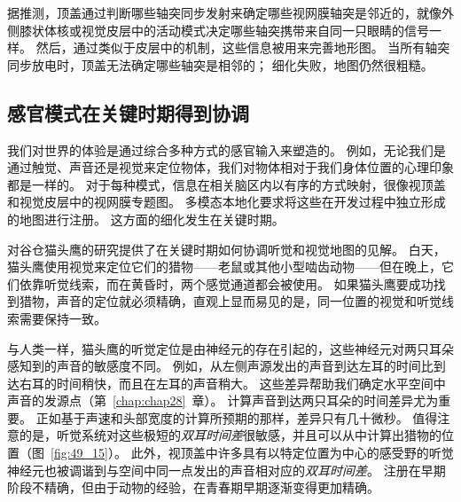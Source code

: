 据推测，顶盖通过判断哪些轴突同步发射来确定哪些视网膜轴突是邻近的，就像外侧膝状体核或视觉皮层中的活动模式决定哪些轴突携带来自同一只眼睛的信号一样。
然后，通过类似于皮层中的机制，这些信息被用来完善地形图。
当所有轴突同步放电时，顶盖无法确定哪些轴突是相邻的；
细化失败，地图仍然很粗糙。



\subsection{感官模式在关键时期得到协调}

我们对世界的体验是通过综合多种方式的感官输入来塑造的。
例如，无论我们是通过触觉、声音还是视觉来定位物体，我们对物体相对于我们身体位置的心理印象都是一样的。
对于每种模式，信息在相关脑区内以有序的方式映射，很像视顶盖和视觉皮层中的视网膜专题图。
多模态本地化要求将这些在开发过程中独立形成的地图进行注册。
这方面的细化发生在关键时期。


对谷仓猫头鹰的研究提供了在关键时期如何协调听觉和视觉地图的见解。
白天，猫头鹰使用视觉来定位它们的猎物——老鼠或其他小型啮齿动物——但在晚上，它们依靠听觉线索，而在黄昏时，两个感觉通道都会被使用。
如果猫头鹰要成功找到猎物，声音的定位就必须精确，直观上显而易见的是，同一位置的视觉和听觉线索需要保持一致。


与人类一样，猫头鹰的听觉定位是由神经元的存在引起的，这些神经元对两只耳朵感知到的声音的敏感度不同。 例如，从左侧声源发出的声音到达左耳的时间比到达右耳的时间稍快，而且在左耳的声音稍大。
这些差异帮助我们确定水平空间中声音的发源点（第~\ref{chap:chap28}~章）。
计算声音到达两只耳朵的时间差异尤为重要。
正如基于声速和头部宽度的计算所预期的那样，差异只有几十微秒。
值得注意的是，听觉系统对这些极短的\textit{双耳时间差}很敏感，并且可以从中计算出猎物的位置（图~\ref{fig:49_15}）。
此外，视顶盖中许多具有以特定位置为中心的感受野的听觉神经元也被调谐到与空间中同一点发出的声音相对应的\textit{双耳时间差}。
注册在早期阶段不精确，但由于动物的经验，在青春期早期逐渐变得更加精确。


